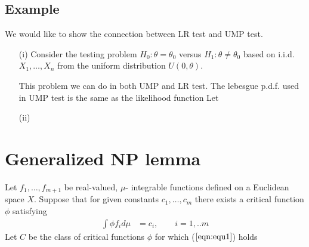 \documentclass[11pt]{article} %
\begin{document}
\subsection{Example}
We would like to show the connection between LR test and UMP test.

\begin{itemize}
\item[(i)] Consider the testing problem $H_0: \theta = \theta_0 $ versus $H_1: \theta \neq \theta_0$ based on i.i.d. $X_1,…,X_n$ from the uniform distribution $U(0,\theta)$.

This problem we can do in both UMP and LR test. The lebesgue p.d.f. used in UMP test is the same as the likelihood function
Let 


\item[(ii)] 


\end{itemize}

\section{Generalized NP lemma}

Let $f_1, …, f_{m+1}$ be real-valued, $\mu$- integrable functions defined on a Euclidean space $X$. Suppose that for given constants $c_1, …, c_m$ there exists a critical function $\phi$ satisfying 
\begin{align}
	\label{eqn:equ1}
	\int \phi f_i d\mu &= c_i, \qquad i=1,..m
\end{align}
Let $C$ be the class of critical functions $\phi$ for which ($\ref{eqn:equ1}$) holds
\end{document}

